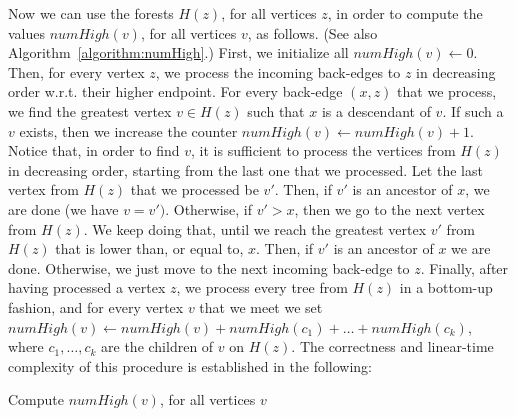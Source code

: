 \documentclass[11pt,a4paper]{article}
\begin{document}
Now we can use the forests $H(z)$, for all vertices $z$, in order to compute the values $\mathit{numHigh}(v)$, for all vertices $v$, as follows. (See also Algorithm~\ref{algorithm:numHigh}.) First, we initialize all $\mathit{numHigh}(v)\leftarrow 0$. Then, for every vertex $z$, we process the incoming back-edges to $z$ in decreasing order w.r.t. their higher endpoint. For every back-edge $(x,z)$ that we process, we find the greatest vertex $v\in H(z)$ such that $x$ is a descendant of $v$. If such a $v$ exists, then we increase the counter $\mathit{numHigh}(v)\leftarrow\mathit{numHigh}(v)+1$. Notice that, in order to find $v$, it is sufficient to process the vertices from $H(z)$ in decreasing order, starting from the last one that we processed. Let the last vertex from $H(z)$ that we processed be $v'$. Then, if $v'$ is an ancestor of $x$, we are done (we have $v=v')$. Otherwise, if $v'>x$, then we go to the next vertex from $H(z)$. We keep doing that, until we reach the greatest vertex $v'$ from $H(z)$ that is lower than, or equal to, $x$. Then, if $v'$ is an ancestor of $x$ we are done. Otherwise, we just move to the next incoming back-edge to $z$. Finally, after having processed a vertex $z$, we process every tree from $H(z)$ in a bottom-up fashion, and for every vertex $v$ that we meet we set $\mathit{numHigh}(v)\leftarrow\mathit{numHigh}(v)+\mathit{numHigh}(c_1)+\dots+\mathit{numHigh}(c_k)$, where $c_1,\dots,c_k$ are the children of $v$ on $H(z)$. The correctness and linear-time complexity of this procedure is established in the following:

\begin{algorithm}[h]
\caption{\textsf{Compute $\mathit{numHigh}(v)$, for all vertices $v$}}
\label{algorithm:numHigh}
\LinesNumbered
\DontPrintSemicolon




\end{algorithm}
\end{document}
